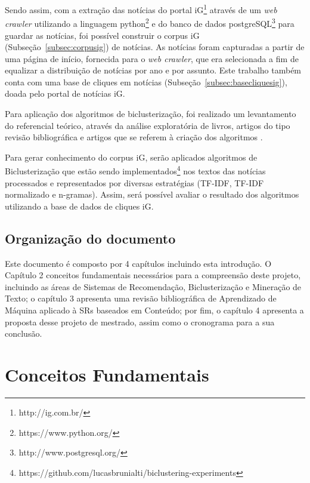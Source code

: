 \documentclass[normaltoc, espacoumemeio, pnumromarab,ruledheader]{abnt}
\begin{document}
Sendo assim, com a extração das notícias do portal iG\footnote{http://ig.com.br/} através de um \textit{web crawler} utilizando a linguagem python\footnote{https://www.python.org/} e do banco de dados postgreSQL\footnote{http://www.postgresql.org/} para guardar as notícias, foi possível construir o corpus iG (Subseção~\ref{subsec:corpusig}) de notícias.
As notícias foram capturadas a partir de uma página de início, fornecida para o \textit{web crawler}, que era selecionada a fim de equalizar a distribuição de notícias por ano e por assunto. Este trabalho também conta com uma base de cliques em notícias (Subseção~\ref{subsec:basecliquesig}), doada pelo portal de notícias iG.

Para aplicação dos algoritmos de biclusterização, foi realizado um levantamento do referencial teórico, através da análise exploratória de livros, artigos do tipo revisão bibliográfica e artigos que se referem à criação dos algoritmos \cite{Cheng2000,Tanay2005,Madeira2004,Santamaria2007,Kluger2003,Prelic2006}.

Para gerar conhecimento do corpus iG, serão aplicados algoritmos de Biclusterização que estão sendo implementados\footnote{https://github.com/lucasbrunialti/biclustering-experiments} nos textos das notícias processados e representados por diversas estratégias (TF-IDF, TF-IDF normalizado e n-gramas). Assim, será possível avaliar o resultado dos algoritmos utilizando a base de dados de cliques iG.

\section{Organização do documento}

Este documento é composto por 4 capítulos incluindo esta introdução. O Capítulo 2 conceitos fundamentais necessários para a compreensão deste projeto, incluindo as áreas de Sistemas de Recomendação, Biclusterização e Mineração de Texto; o capítulo 3 apresenta uma revisão bibliográfica de Aprendizado de Máquina aplicado à SRs baseados em Conteúdo; por fim, o capítulo 4 apresenta a proposta desse projeto de mestrado, assim como o cronograma para a sua conclusão.

\chapter{Conceitos Fundamentais}
\end{document}
